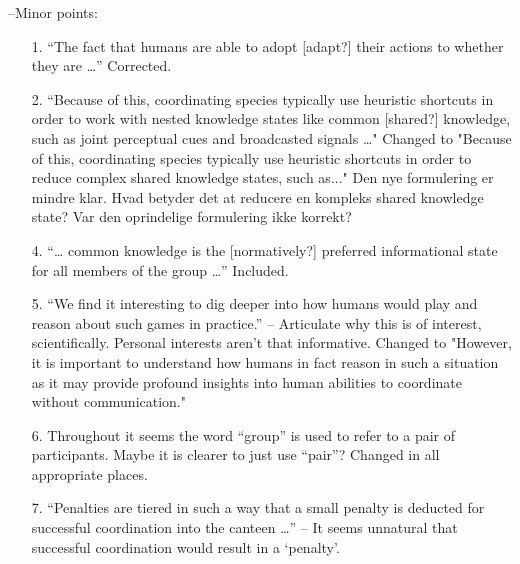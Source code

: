 \documentclass[a4paper]{article}
\newenvironment{response}{\smallskip \noindent \color{blue}}{\color{black}\smallskip}
\newenvironment{tobo}{\smallskip \noindent \color{yellow!80!black!80}}{\color{black}\smallskip}
\begin{document}




--Minor points:
\begin{enumerate}
   \item[1.]    “The fact that humans are able to adopt [adapt?] their actions to whether they are …” \begin{response} Corrected. \end{response}
   \item[2.]    “Because of this, coordinating species typically use heuristic shortcuts in order to work with nested knowledge states like common [shared?] knowledge, such as joint perceptual cues and broadcasted signals …" \begin{response}Changed to "Because of this, coordinating species typically use heuristic shortcuts in order to reduce complex shared knowledge states, such as..."\end{response} \begin{tobo} Den nye formulering er mindre klar. Hvad betyder det at reducere en kompleks shared knowledge state? Var den oprindelige formulering ikke korrekt?  \end{tobo}
  \item[4.]    “… common knowledge is the [normatively?] preferred informational state for all members of the group …” \begin{response} Included. \end{response}
  \item[5.]    “We find it interesting to dig deeper into how humans would play and reason about such games in practice.” – Articulate why this is of interest, scientifically. Personal interests aren’t that informative. \begin{response}Changed to "However, it is important to understand how humans in fact reason in such a situation as it may provide profound insights into human abilities to coordinate without communication." \end{response}
  \item[6.]    Throughout it seems the word “group” is used to refer to a pair of participants. Maybe it is clearer to just use “pair”?  \begin{response} Changed in all appropriate places. \end{response}
  \item[7.]    “Penalties are tiered in such a way that a small penalty is deducted for successful coordination into the canteen …” – It seems unnatural that successful coordination would result in a ‘penalty’.  
  

\end{enumerate}
\end{document}
